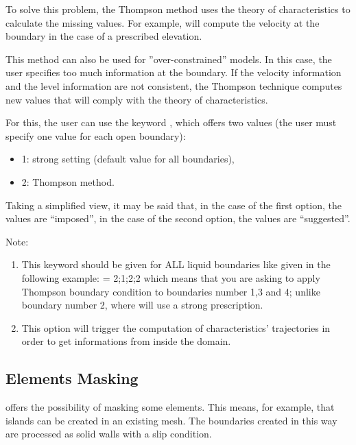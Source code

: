 To solve this problem, the Thompson method uses the theory of characteristics
to calculate the missing values.
For example,  will compute the velocity at the boundary in the case
of a prescribed elevation.

This method can also be used for ''over-constrained'' models.
In this case, the user specifies too much information at the boundary.
If the velocity information and the level information are not consistent,
the Thompson technique computes new values that will comply
with the theory of characteristics.

For this, the user can use the keyword ,
which offers two values (the user must specify one value for each open boundary):

\begin{itemize}
\item 1: strong setting (default value for all boundaries),

\item 2: Thompson method.
\end{itemize}

Taking a simplified view, it may be said that, in the case of the first option,
the values are ``imposed'', in the case of the second option, the values are
``suggested''.

\begin{WarningBlock}{Note:}
\begin{enumerate}
\item This keyword should be given for ALL liquid boundaries like given in the
following example: \newline
{}= 2;1;2;2 \newline
which means that you are asking  to apply Thompson boundary
condition to boundaries number 1,3 and 4;
unlike boundary number 2, where  will use a strong prescription.
\item This option will trigger the computation of characteristics' trajectories
in order to get informations from inside the domain.
\end{enumerate}
\end{WarningBlock}

\subsection{Elements Masking}

 offers the possibility of masking some elements.
This means, for example, that islands can be created in an existing mesh.
The boundaries created in this way are processed as solid walls with a slip
condition.

